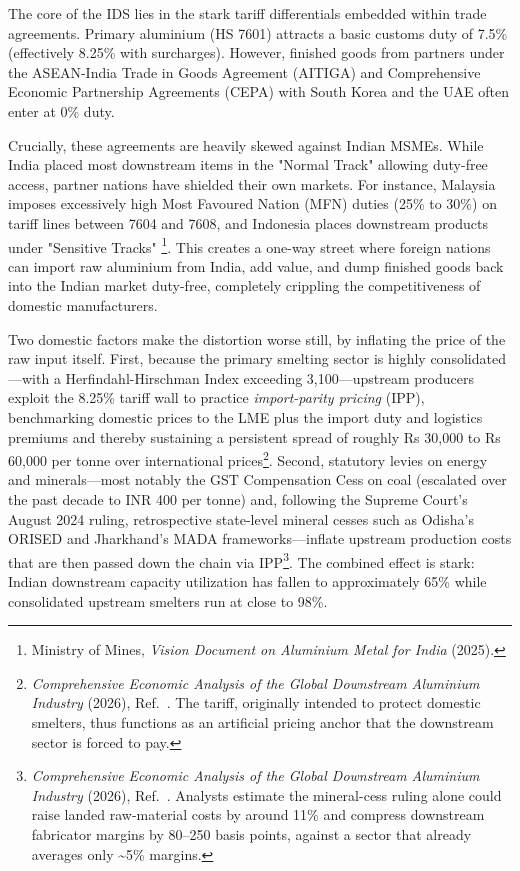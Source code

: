 \documentclass[11pt, a4paper]{article}
\numberwithin{figure}{section}
\numberwithin{table}{section}
\begin{document}
The core of the IDS lies in the stark tariff differentials embedded within trade agreements. Primary aluminium (HS 7601) attracts a basic customs duty of 7.5\% (effectively 8.25\% with surcharges). However, finished goods from partners under the ASEAN-India Trade in Goods Agreement (AITIGA) and Comprehensive Economic Partnership Agreements (CEPA) with South Korea and the UAE often enter at 0\% duty.

Crucially, these agreements are heavily skewed against Indian MSMEs. While India placed most downstream items in the "Normal Track" allowing duty-free access, partner nations have shielded their own markets. For instance, Malaysia imposes excessively high Most Favoured Nation (MFN) duties (25\% to 30\%) on tariff lines between 7604 and 7608, and Indonesia places downstream products under "Sensitive Tracks" \cite{mom_vision2025}\footnote{Ministry of Mines, \textit{Vision Document on Aluminium Metal for India} (2025).}. This creates a one-way street where foreign nations can import raw aluminium from India, add value, and dump finished goods back into the Indian market duty-free, completely crippling the competitiveness of domestic manufacturers.

Two domestic factors make the distortion worse still, by inflating the price of the raw input itself. First, because the primary smelting sector is highly consolidated—with a Herfindahl-Hirschman Index exceeding 3,100—upstream producers exploit the 8.25\% tariff wall to practice \textit{import-parity pricing} (IPP), benchmarking domestic prices to the LME plus the import duty and logistics premiums and thereby sustaining a persistent spread of roughly Rs 30,000 to Rs 60,000 per tonne over international prices\footnote{\textit{Comprehensive Economic Analysis of the Global Downstream Aluminium Industry} (2026), Ref.~\cite{costreg2026}. The tariff, originally intended to protect domestic smelters, thus functions as an artificial pricing anchor that the downstream sector is forced to pay.}. Second, statutory levies on energy and minerals—most notably the GST Compensation Cess on coal (escalated over the past decade to INR 400 per tonne) and, following the Supreme Court's August 2024 ruling, retrospective state-level mineral cesses such as Odisha's ORISED and Jharkhand's MADA frameworks—inflate upstream production costs that are then passed down the chain via IPP\footnote{\textit{Comprehensive Economic Analysis of the Global Downstream Aluminium Industry} (2026), Ref.~\cite{costreg2026}. Analysts estimate the mineral-cess ruling alone could raise landed raw-material costs by around 11\% and compress downstream fabricator margins by 80--250 basis points, against a sector that already averages only \textasciitilde5\% margins.}. The combined effect is stark: Indian downstream capacity utilization has fallen to approximately 65\% while consolidated upstream smelters run at close to 98\%.
\end{document}
